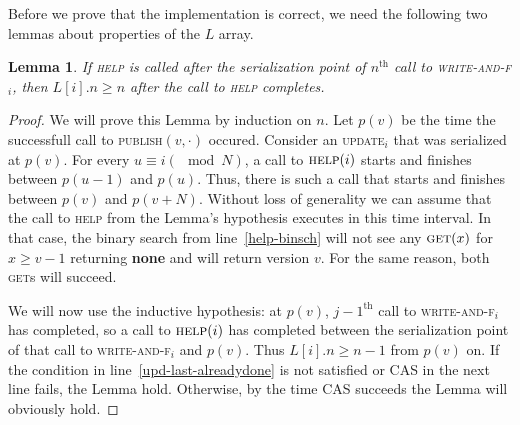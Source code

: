 \documentclass[a4paper,11pt]{article}
\def\none{\textbf{none} }
\newtheorem{lemma}{Lemma}
\newcommand{\fn}[1]{\textsc{#1}}
\begin{document}
Before we prove that the implementation is correct, we need the following two lemmas about properties of the $L$ array.

\begin{lemma}
	If \fn{help} is called after the serialization point of $n^{\text{th}}$ call to \fn{write-and-f$_i$}, then $L[i].n \geq n$ after the call to \fn{help} completes. \label{last-is-complete}
\end{lemma}
\begin{proof}
	We will prove this Lemma by induction on $n$. Let $p(v)$ be the time the successfull call to \fn{publish}$(v, \cdot)$ occured. Consider an \fn{update$_i$} that was serialized at $p(v)$.
	For every $u \equiv i (\mod N)$, a call to $\fn{help}(i)$ starts and finishes between $p(u-1)$ and $p(u)$. Thus, there is such a call that starts and finishes between $p(v)$ and $p(v+N)$.
	Without loss of generality we can assume that the call to \fn{help} from the Lemma's hypothesis executes in this time interval. In that case, the binary search from line~\ref{help-binsch} will not see any
	$\fn{get}(x)$ for $x \geq v-1$ returning \none and will	return version $v$. For the same reason, both \fn{get}s will succeed.

	We will now use the inductive hypothesis: at $p(v)$, $j-1^{\text{th}}$ call to \fn{write-and-f$_i$} has completed, so a call to $\fn{help}(i)$ has completed between the serialization point of that call to \fn{write-and-f$_i$}
	and $p(v)$. Thus $L[i].n \geq n-1$ from $p(v)$ on. If the condition in line~\ref{upd-last-alreadydone} is not satisfied or CAS in the next line fails, the Lemma hold.
	Otherwise, by the time CAS succeeds the Lemma will obviously hold.
	
\end{proof}
\end{document}
